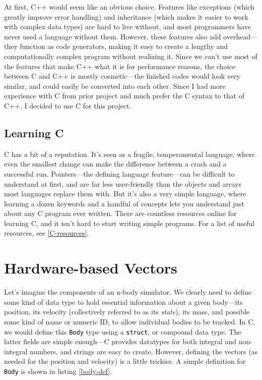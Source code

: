 \documentclass[12pt,twoside]{reedthesis}
\newcommand\code[1]{\colorbox{light-gray}{\texttt{\textcolor{black}{#1}}}}
\begin{document}
At first, C++ would seem like an obvious choice. Features like exceptions (which greatly improve error handling) and inheritance (which makes it easier to work with complex data types) are hard to live without, and most programmers have never used a language without them. However, these features also add overhead---they function as code generators, making it easy to create a lengthy and computationally complex program without realizing it. Since we can't use most of the features that make C++ what it is for performance reasons, the choice between C and C++ is mostly cosmetic---the finished codes would look very similar, and could easily be converted into each other. Since I had more experience with C from prior project and much prefer the C syntax to that of C++, I decided to use C for this project.

\subsection{Learning C}
C has a bit of a reputation. It's seen as a fragile, temperamental language, where even the smallest change can make the difference between a crash and a successful run. Pointers---the defining language feature---can be difficult to understand at first, and are far less user-friendly than the objects and arrays most languages replace them with. But it's also a very simple language, where learning a dozen keywords and a handful of concepts lets you understand just about any C program ever written. There are countless resources online for learning C, and it isn't hard to start writing simple programs. For a list of useful resources, see \ref{C-resources}.


\section{Hardware-based Vectors}

Let's imagine the components of an n-body simulator. We clearly need to define some kind of data type to hold essential information about a given body---its position, its velocity (collectively referred to as its \emph{state}), its mass, and possible some kind of name or numeric ID, to allow individual bodies to be tracked. In C, we would define this \code{Body} type using a \code{struct}, or compound data type. The latter fields are simple enough---C provides datatypes for both integral and non-integral numbers, and strings are easy to create. However, defining the vectors (as needed for the position and velocity) is a little trickier. A simple definition for \code{Body} is shown in listing \ref{body-def}.
\end{document}
